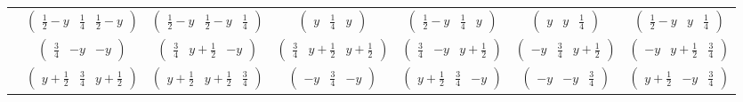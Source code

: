 \documentclass[fleqn,9pt,landscape]{jsarticle}
\begin{document}
\begin{center}
\begin{longtable}{ccccccc}
& $ \begin{pmatrix} \frac{1}{2} - y & \frac{1}{4} & \frac{1}{2} - y \end{pmatrix} $ & $ \begin{pmatrix} \frac{1}{2} - y & \frac{1}{2} - y & \frac{1}{4} \end{pmatrix} $ & $ \begin{pmatrix} y & \frac{1}{4} & y \end{pmatrix} $ & $ \begin{pmatrix} \frac{1}{2} - y & \frac{1}{4} & y \end{pmatrix} $ & $ \begin{pmatrix} y & y & \frac{1}{4} \end{pmatrix} $ & $ \begin{pmatrix} \frac{1}{2} - y & y & \frac{1}{4} \end{pmatrix} $ \\
& $ \begin{pmatrix} \frac{3}{4} & - y & - y \end{pmatrix} $ & $ \begin{pmatrix} \frac{3}{4} & y + \frac{1}{2} & - y \end{pmatrix} $ & $ \begin{pmatrix} \frac{3}{4} & y + \frac{1}{2} & y + \frac{1}{2} \end{pmatrix} $ & $ \begin{pmatrix} \frac{3}{4} & - y & y + \frac{1}{2} \end{pmatrix} $ & $ \begin{pmatrix} - y & \frac{3}{4} & y + \frac{1}{2} \end{pmatrix} $ & $ \begin{pmatrix} - y & y + \frac{1}{2} & \frac{3}{4} \end{pmatrix} $ \\
& $ \begin{pmatrix} y + \frac{1}{2} & \frac{3}{4} & y + \frac{1}{2} \end{pmatrix} $ & $ \begin{pmatrix} y + \frac{1}{2} & y + \frac{1}{2} & \frac{3}{4} \end{pmatrix} $ & $ \begin{pmatrix} - y & \frac{3}{4} & - y \end{pmatrix} $ & $ \begin{pmatrix} y + \frac{1}{2} & \frac{3}{4} & - y \end{pmatrix} $ & $ \begin{pmatrix} - y & - y & \frac{3}{4} \end{pmatrix} $ & $ \begin{pmatrix} y + \frac{1}{2} & - y & \frac{3}{4} \end{pmatrix} $ \\ \hline

\end{longtable}
\end{center}
\end{document}
